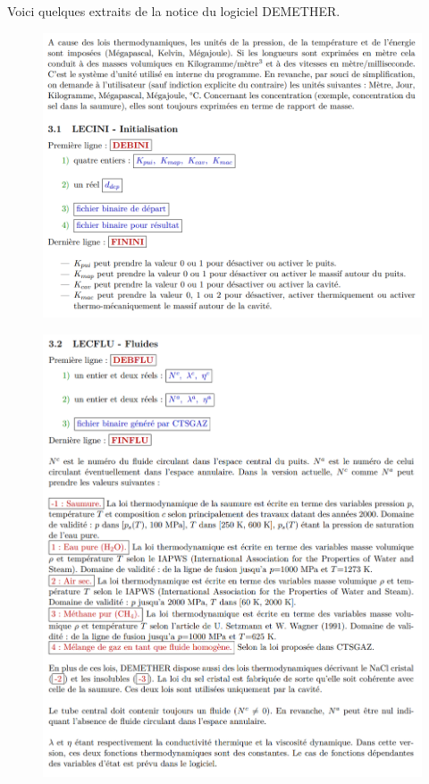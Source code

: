 \documentclass[11pt,french,a4paper]{article}
\begin{document}
Voici quelques extraits de la notice du logiciel DEMETHER.

\begin{figure}[h]
\centering
\includegraphics[width=.8\linewidth]{image/annexe/DEMETHER/Notice DEMETHER 1.png}
\end{figure}

\begin{figure}[h]
\centering
\includegraphics[width=.8\linewidth]{image/annexe/DEMETHER/Notice DEMETHER 2.png}
\end{figure}
\end{document}
